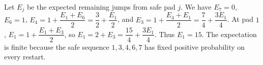 Let $E_j$ be the expected remaining jumps from safe pad $j$. We have $E_7=0$, $E_6=1$, $E_4=1+\dfrac{E_1+E_6}{2}=\dfrac{3}{2}+\dfrac{E_1}{2}$, and $E_3=1+\dfrac{E_4+E_1}{2}=\dfrac{7}{4}+\dfrac{3E_1}{4}$. At pad $1$, $E_1=1+\dfrac{E_1+E_3}{2}$, so $E_1=2+E_3=\dfrac{15}{4}+\dfrac{3E_1}{4}$. Thus $\boxed{E_1=15}$. The expectation is finite because the safe sequence $1,3,4,6,7$ has fixed positive probability on every restart.
